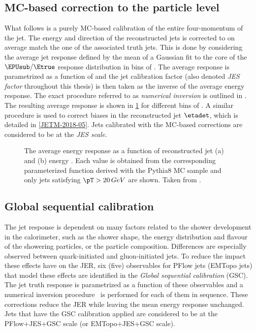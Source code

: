 \subsection{MC-based correction to the particle level}
What follows is a purely MC-based calibration of the entire four-momentum of the jet. The energy and direction of the reconstructed jets is corrected to on average match the one of the associated truth jets. This is done by considering the average jet response defined by the mean of a Gaussian fit to the core of the $\EPUsub / \Etrue$ response distribution in bins of \Etrue. The average response is parametrized as a function of \EPUsub and the jet calibration factor (also denoted \emph{JES factor} throughout this thesis) is then taken as the inverse of the average energy response. The exact procedure referred to as \emph{numerical inversion} is outlined in . The resulting average response is shown in \cref{fig:jes-calibration-jet-response} for different bins of \etadet. A similar procedure is used to correct biases in the reconstructed jet $\etadet$, which is detailed in \cref{JETM-2018-05}.
Jets calibrated with the MC-based corrections are considered to be at the \emph{JES scale}.

\begin{figure}
    \caption{The average energy response as a function of reconstructed jet (a) \etadet and (b) energy \Ereco. Each value is obtained from the corresponding parameterized function derived with the Pythia8 MC sample and only jets satisfying $\pT > 20\,GeV$ are shown. Taken from .}
    \label{fig:jes-calibration-jet-response}
\end{figure}

\subsection{Global sequential calibration}
The jet response is dependent on many factors related to the shower development in the calorimeter, such as the shower shape, the energy distribution and flavour of the showering particles, or the particle composition.
Differences are especially observed between quark-initiated and gluon-initiated jets.
To reduce the impact these effects have on the JER, six (five) observables for PFlow jets (EMTopo jets) that model these effects are identified in the \emph{Global sequential calibration} (GSC). The jet truth response is parametrized as a function of these observables and a numerical inversion procedure~\cite{PERF-2011-03} is performed for each of them in sequence.
These corrections reduce the JER while leaving the mean energy response unchanged.
Jets that have the GSC calibration applied are considered to be at the PFlow+JES+GSC scale (or EMTopo+JES+GSC scale).

